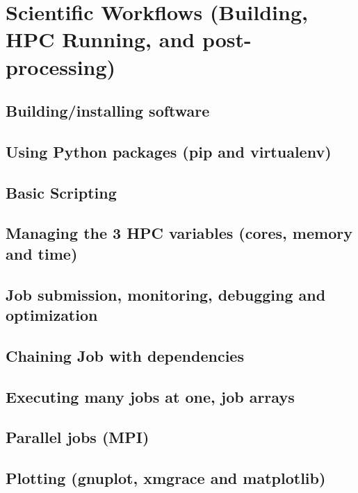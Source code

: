 \chapter{Scientific Workflows (Building, HPC Running, and post-processing)}


\section{Building/installing software}
\section{Using Python packages (pip and virtualenv)}
\section{Basic Scripting}
\section{Managing the 3 HPC variables (cores, memory and time)}
\section{Job submission, monitoring, debugging and optimization}
\section{Chaining Job with dependencies}
\section{Executing many jobs at one, job arrays}
\section{Parallel jobs (MPI)}
\section{Plotting (gnuplot, xmgrace and matplotlib)}


